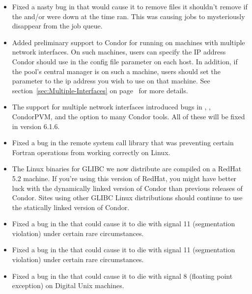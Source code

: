 \begin{itemize}

\item Fixed a nasty bug in  that would cause it to
remove files it shouldn't remove if the  and/or
 were down at the time  ran.
This was causing jobs to mysteriously disappear from the job queue.

\item Added preliminary support to Condor for running on machines with
multiple network interfaces.
On such machines, users can specify the IP address Condor should use
in the  config file parameter on each host. 
In addition, if the pool's central manager is on such a machine, users
should set the  parameter to the ip address you wish
to use on that machine.
See section~\ref{sec:Multiple-Interfaces} on
page~\pageref{sec:Multiple-Interfaces} for more details.

\item The support for multiple network interfaces introduced bugs in
, , CondorPVM, and the 
option to many Condor tools.
All of these will be fixed in version 6.1.6.

\item Fixed a bug in the remote system call library that was
preventing certain Fortran operations from working correctly on
Linux.  

\item The Linux binaries for GLIBC we now distribute are compiled on a
RedHat 5.2 machine.
If you're using this version of RedHat, you might have better luck
with the dynamically linked version of Condor than previous releases
of Condor.
Sites using other GLIBC Linux distributions should continue to use the
statically linked version of Condor.

\item Fixed a bug in the  that could cause it to die
with signal 11 (segmentation violation) under certain rare
circumstances. 

\item Fixed a bug in the  that could cause it to die
with signal 11 (segmentation violation) under certain rare
circumstances. 

\item Fixed a bug in the  that could cause it to
die with signal 8 (floating point exception) on Digital Unix
machines. 


\end{itemize}

